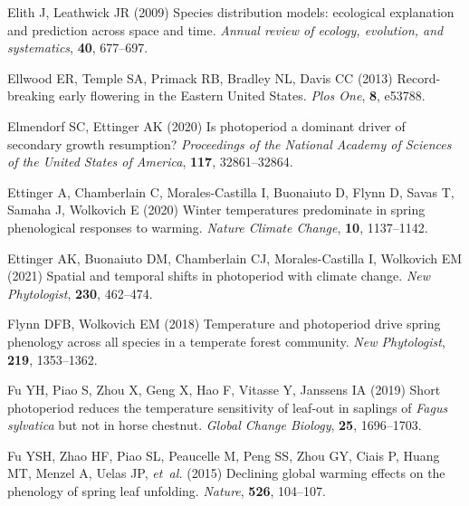 \documentclass[11pt,letter]{article}
\begin{document}
\begin{thebibliography}{63}
Elith J, Leathwick JR (2009) Species distribution models: ecological
  explanation and prediction across space and time.
\newblock \emph{Annual review of ecology, evolution, and systematics},
  \textbf{40}, 677--697.

Ellwood ER, Temple SA, Primack RB, Bradley NL, Davis CC (2013) {Record-breaking
  early flowering in the Eastern United States}.
\newblock \emph{Plos One}, \textbf{8}, e53788.

Elmendorf SC, Ettinger AK (2020) Is photoperiod a dominant driver of secondary
  growth resumption?
\newblock \emph{Proceedings of the National Academy of Sciences of the United
  States of America}, \textbf{117}, 32861--32864.

Ettinger A, Chamberlain C, Morales-Castilla I, Buonaiuto D, Flynn D, Savas T,
  Samaha J, Wolkovich E (2020) Winter temperatures predominate in spring
  phenological responses to warming.
\newblock \emph{Nature Climate Change}, \textbf{10}, 1137--1142.

Ettinger AK, Buonaiuto DM, Chamberlain CJ, Morales-Castilla I, Wolkovich EM
  (2021) Spatial and temporal shifts in photoperiod with climate change.
\newblock \emph{New Phytologist}, \textbf{230}, 462--474.

Flynn DFB, Wolkovich EM (2018) Temperature and photoperiod drive spring
  phenology across all species in a temperate forest community.
\newblock \emph{New Phytologist}, \textbf{219}, 1353--1362.

Fu YH, Piao S, Zhou X, Geng X, Hao F, Vitasse Y, Janssens IA (2019) {Short
  photoperiod reduces the temperature sensitivity of leaf-out in saplings of
  \emph{Fagus sylvatica} but not in horse chestnut}.
\newblock \emph{Global Change Biology}, \textbf{25}, 1696--1703.

Fu YSH, Zhao HF, Piao SL, Peaucelle M, Peng SS, Zhou GY, Ciais P, Huang MT,
  Menzel A, Uelas JP, \emph{et~al.} (2015) Declining global warming effects on
  the phenology of spring leaf unfolding.
\newblock \emph{Nature}, \textbf{526}, 104--107.


\end{thebibliography}
\end{document}
